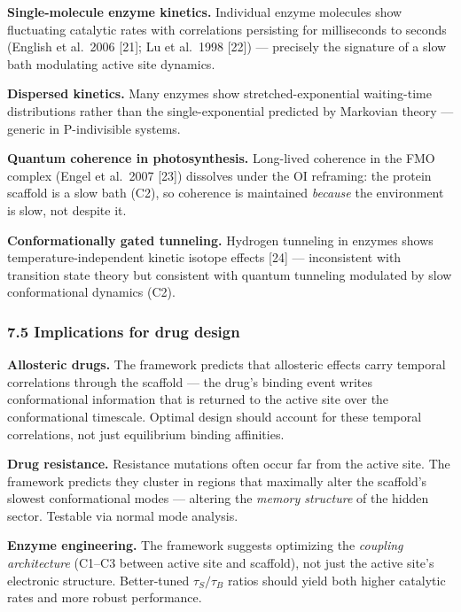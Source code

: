 \documentclass[
]{article}
\begin{document}
\textbf{Single-molecule enzyme kinetics.} Individual enzyme molecules
show fluctuating catalytic rates with correlations persisting for
milliseconds to seconds (English et al.~2006 {[}21{]}; Lu et al.~1998
{[}22{]}) --- precisely the signature of a slow bath modulating active
site dynamics.

\textbf{Dispersed kinetics.} Many enzymes show stretched-exponential
waiting-time distributions rather than the single-exponential predicted
by Markovian theory --- generic in P-indivisible systems.

\textbf{Quantum coherence in photosynthesis.} Long-lived coherence in
the FMO complex (Engel et al.~2007 {[}23{]}) dissolves under the OI
reframing: the protein scaffold is a slow bath (C2), so coherence is
maintained \emph{because} the environment is slow, not despite it.

\textbf{Conformationally gated tunneling.} Hydrogen tunneling in enzymes
shows temperature-independent kinetic isotope effects {[}24{]} ---
inconsistent with transition state theory but consistent with quantum
tunneling modulated by slow conformational dynamics (C2).

\hypertarget{implications-for-drug-design}{%
\subsubsection{7.5 Implications for drug
design}\label{implications-for-drug-design}}

\textbf{Allosteric drugs.} The framework predicts that allosteric
effects carry temporal correlations through the scaffold --- the drug's
binding event writes conformational information that is returned to the
active site over the conformational timescale. Optimal design should
account for these temporal correlations, not just equilibrium binding
affinities.

\textbf{Drug resistance.} Resistance mutations often occur far from the
active site. The framework predicts they cluster in regions that
maximally alter the scaffold's slowest conformational modes --- altering
the \emph{memory structure} of the hidden sector. Testable via normal
mode analysis.

\textbf{Enzyme engineering.} The framework suggests optimizing the
\emph{coupling architecture} (C1--C3 between active site and scaffold),
not just the active site's electronic structure. Better-tuned
\(\tau_S / \tau_B\) ratios should yield both higher catalytic rates and
more robust performance.
\end{document}
